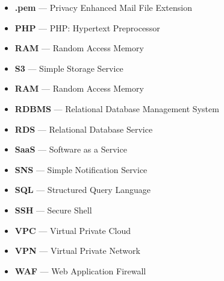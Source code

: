 \begin{itemize}
    \item  \textbf{.pem} — Privacy Enhanced Mail File Extension
    \item  \textbf{PHP} — PHP: Hypertext Preprocessor
    \item  \textbf{RAM} — Random Access Memory
    \item  \textbf{S3} — Simple Storage Service
    \item  \textbf{RAM} — Random Access Memory
    \item  \textbf{RDBMS} — Relational Database Management System
    \item  \textbf{RDS} — Relational Database Service
    \item  \textbf{SaaS} — Software as a Service
    \item  \textbf{SNS} — Simple Notification Service
    \item  \textbf{SQL} — Structured Query Language
    \item  \textbf{SSH} — Secure Shell
    \item  \textbf{VPC} — Virtual Private Cloud
    \item  \textbf{VPN} — Virtual Private Network
    \item  \textbf{WAF} — Web Application Firewall
\end{itemize}